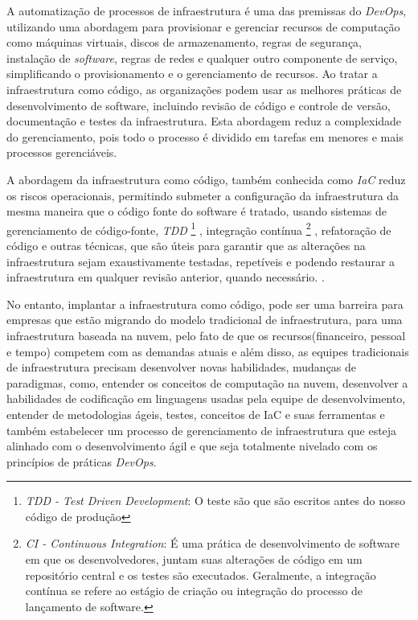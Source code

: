 A automatização de processos de infraestrutura é uma das premissas do \textit{DevOps}, utilizando uma abordagem para provisionar e gerenciar recursos de computação como máquinas virtuais, discos de armazenamento, regras de segurança, instalação de \textit{software}, regras de redes e qualquer outro componente de serviço, simplificando o provisionamento e o gerenciamento de recursos. Ao tratar a infraestrutura como código, as organizações podem usar as melhores práticas de desenvolvimento de software, incluindo revisão de código e controle de versão, documentação e testes da infraestrutura. Esta abordagem reduz a complexidade do gerenciamento, pois todo o processo é dividido em tarefas em menores e mais processos gerenciáveis. \cite{Morris:2016:ICM:3006361}

A abordagem da infraestrutura como código, também conhecida como \textit{IaC} reduz os riscos operacionais, permitindo submeter a configuração da infraestrutura da mesma maneira que o código fonte do software é tratado, usando sistemas de gerenciamento de código-fonte, \textit{TDD} \footnote{\textit{TDD - Test Driven Development}: O teste são que são escritos antes do nosso código de produção} , integração contínua \footnote{\textit{CI - Continuous Integration}: É uma prática de desenvolvimento de software em que os desenvolvedores, juntam suas alterações de código em um repositório central e os testes são executados. Geralmente, a integração contínua se refere ao estágio de criação ou integração do processo de lançamento de software.} , refatoração de código e outras técnicas, que são úteis para garantir que as alterações na infraestrutura sejam exaustivamente testadas, repetíveis e podendo restaurar a infraestrutura em qualquer revisão anterior, quando necessário. \cite{Morris:2016:ICM:3006361}.


No entanto, implantar a infraestrutura como código, pode ser uma barreira para empresas que estão migrando do modelo tradicional de infraestrutura, para uma infraestrutura baseada na nuvem, pelo fato de que os recursos(financeiro, pessoal e tempo) competem com as demandas atuais e além disso, as equipes tradicionais de infraestrutura precisam desenvolver novas habilidades, mudanças de paradigmas, como, entender os conceitos de computação na nuvem, desenvolver a habilidades de codificação em linguagens usadas pela equipe de desenvolvimento, entender de metodologias ágeis, testes, conceitos de IaC e suas ferramentas e também estabelecer um processo de gerenciamento de infraestrutura que esteja alinhado com o desenvolvimento ágil e que seja totalmente nivelado com os princípios de práticas \textit{DevOps}. 


